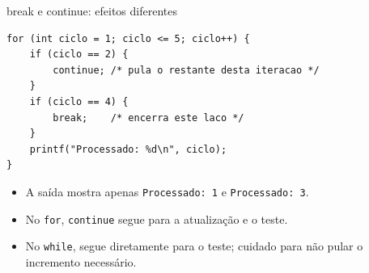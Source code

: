 \begin{frame}[fragile]{break e continue: efeitos diferentes}
\begin{lstlisting}
for (int ciclo = 1; ciclo <= 5; ciclo++) {
    if (ciclo == 2) {
        continue; /* pula o restante desta iteracao */
    }
    if (ciclo == 4) {
        break;    /* encerra este laco */
    }
    printf("Processado: %d\n", ciclo);
}
\end{lstlisting}
\begin{itemize}
\item A saída mostra apenas \texttt{Processado: 1} e \texttt{Processado: 3}.
\item No \texttt{for}, \texttt{continue} segue para a atualização e o teste.
\item No \texttt{while}, segue diretamente para o teste; cuidado para não pular o incremento necessário.
\end{itemize}
\end{frame}
